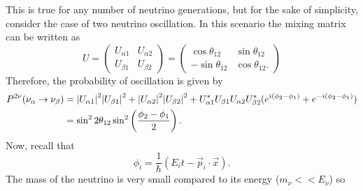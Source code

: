 This is true for any number of neutrino generations, but for the sake of simplicity, consider the case of two neutrino oscillation. In this scenario the mixing matrix can be written as 
\begin{equation}	
U = 
\begin{pmatrix}
U_{\alpha 1} & U_{\alpha 2} \\
U_{\beta 1} & U_{\beta 2}
\end{pmatrix} = 
\begin{pmatrix}
\cos\theta_{12} & \sin\theta_{12} \\
-\sin\theta_{12} & \cos\theta_{12}.
\end{pmatrix}
\end{equation}
Therefore, the probability of oscillation is given by
\begin{equation}
\begin{split}
P^{2\nu}(\nu_\alpha \rightarrow \nu_\beta) 
&=  \abs{U_{\alpha 1}}^{2}\abs{U_{\beta 1}}^2 + \abs{U_{\alpha 2}}^2\abs{U_{\beta 2}}^2 +
U^{*}_{\alpha 1}U_{\beta 1}U_{\alpha 2}U^{*}_{\beta 2}(e^{i(\phi_2-\phi_1)} + e^{-i(\phi_2 - \phi_1)}) \\ 
&= \sin^22\theta_{12}\sin^2\left(\frac{\phi_2-\phi_1}{2}\right).
\end{split}
\end{equation}
Now, recall that 
\begin{equation}
	\phi_i = \frac{1}{\hbar}(E_{i}t - \vec{p}_{i}\cdot\vec{x}).
\end{equation}
The mass of the neutrino is very small compared to its energy ($m_\nu << E_\nu$) so 
